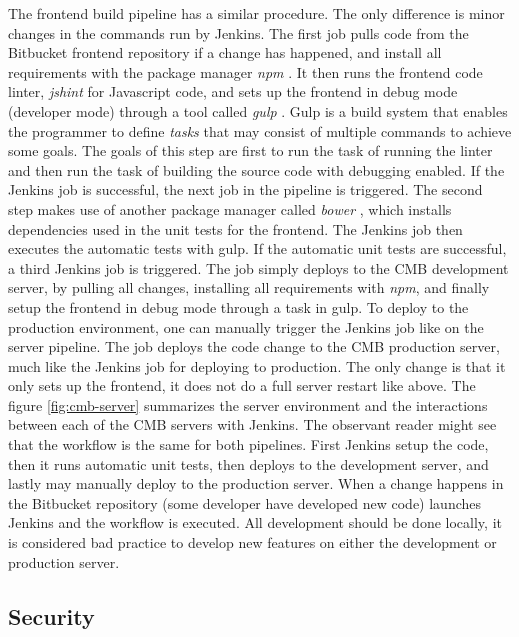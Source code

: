 The frontend build pipeline has a similar procedure. The only difference is minor changes in the commands run by Jenkins. The first job pulls code from the Bitbucket frontend repository if a change has happened, and install all requirements with the package manager \textit{npm} \cite{m:npm}. It then runs the frontend code linter, \textit{jshint} \cite{m:jshint} for Javascript code, and sets up the frontend in debug mode (developer mode) through a tool called \textit{gulp} \cite{m:gulp}. Gulp is a build system that enables the programmer to define \textit{tasks} that may consist of multiple commands to achieve some goals. The goals of this step are first to run the task of running the linter and then run the task of building the source code with debugging enabled. If the Jenkins job is successful, the next job in the pipeline is triggered. The second step makes use of another package manager called \textit{bower} \cite{m:bower}, which installs dependencies used in the unit tests for the frontend. The Jenkins job then executes the automatic tests with gulp. If the automatic unit tests are successful, a third Jenkins job is triggered. The job simply deploys to the CMB development server, by pulling all changes, installing all requirements with \textit{npm}, and finally setup the frontend in debug mode through a task in gulp. To deploy to the production environment, one can manually trigger the Jenkins job like on the server pipeline. The job deploys the code change to the CMB production server, much like the Jenkins job for deploying to production. The only change is that it only sets up the frontend, it does not do a full server restart like above. The figure \ref{fig:cmb-server} summarizes the server environment and the interactions between each of the CMB servers with Jenkins. The observant reader might see that the workflow is the same for both pipelines. First Jenkins setup the code, then it runs automatic unit tests, then deploys to the development server, and lastly may manually deploy to the production server. When a change happens in the Bitbucket repository (some developer have developed new code) launches Jenkins and the workflow is executed. All development should be done locally, it is considered bad practice to develop new features on either the development or production server.

\subsection{Security}

